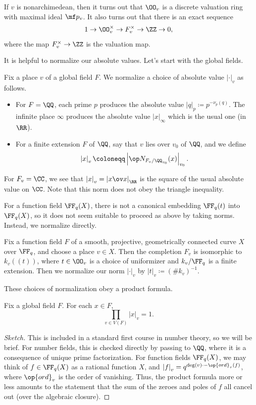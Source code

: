 \documentclass[../notes.tex]{subfiles}
\begin{document}
\begin{remark}
	If $v$ is nonarchimedean, then it turns out that $\OO_v$ is a discrete valuation ring with maximal ideal $\mf p_v$. It also turns out that there is an exact sequence
	\[1\to\OO_v^\times\to F_v^\times\to\ZZ\to0,\]
	where the map $F_v^\times\to\ZZ$ is the valuation map.
\end{remark}
It is helpful to normalize our absolute values. Let's start with the global fields.
\begin{notation}
	Fix a place $v$ of a global field $F$. We normalize a choice of absolute value $\left|\cdot\right|_v$ as follows.
	\begin{itemize}
		\item For $F=\QQ$, each prime $p$ produces the absolute value $\left|q\right|_p\coloneqq p^{-\nu_p(q)}$. The infinite place $\infty$ produces the absolute value $\left|x\right|_\infty$ which is the usual one (in $\RR$).
		\item For a finite extension $F$ of $\QQ$, say that $v$ lies over $v_0$ of $\QQ$, and we define
		\[\left|x\right|_v\coloneqq\left|\op N_{F_v/\QQ_{v_0}}(x)\right|_{v_0}.\]
	\end{itemize}
\end{notation}
\begin{example}
	For $F_v=\CC$, we see that $\left|x\right|_v=\left|x\ov x\right|_\RR$ is the square of the usual absolute value on $\CC$. Note that this norm does not obey the triangle inequality.
\end{example}
For a function field $\FF_q(X)$, there is not a canonical embedding $\FF_q(t)$ into $\FF_q(X)$, so it does not seem suitable to proceed as above by taking norms. Instead, we normalize directly.
\begin{notation}
	Fix a function field $F$ of a smooth, projective, geometrically connected curve $X$ over $\FF_q$, and choose a place $v\in X$. Then the completion $F_v$ is isomorphic to $k_v((t))$, where $t\in\OO_v$ is a choice of uniformizer and $k_v/\FF_q$ is a finite extension. Then we normalize our norm $\left|\cdot\right|_v$ by $\left|t\right|_v\coloneqq(\#k_v)^{-1}$.
\end{notation}
These choices of normalization obey a product formula.
\begin{proposition} \label{prop:product-formula}
	Fix a global field $F$. For each $x\in F$,
	\[\prod_{v\in V(F)}\left|x\right|_v=1.\]
\end{proposition}
\begin{proof}[Sketch]
	This is included in a standard first course in number theory, so we will be brief. For number fields, this is checked directly by passing to $\QQ$, where it is a consequence of unique prime factorization. For function fields $\FF_q(X)$, we may think of $f\in\FF_q(X)$ as a rational function $X$, and $\left|f\right|_v=q^{\deg(v)\cdot-\op{ord}_v(f)}$, where $\op{ord}_v$ is the order of vanishing. Thus, the product formula more or less amounts to the statement that the sum of the zeroes and poles of $f$ all cancel out (over the algebraic closure).
\end{proof}
\end{document}
